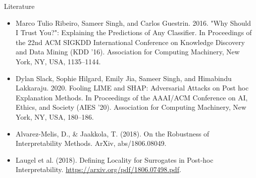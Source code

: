 \documentclass[11pt,compress,t,notes=noshow, xcolor=table]{beamer}
\begin{document}
\begin{vbframe}{Literature}
	\begin{itemize}
		\small
		\item Marco Tulio Ribeiro, Sameer Singh, and Carlos Guestrin. 2016. "Why Should I Trust You?": Explaining the Predictions of Any Classifier. In Proceedings of the 22nd ACM SIGKDD International Conference on Knowledge Discovery and Data Mining (KDD '16). Association for Computing Machinery, New York, NY, USA, 1135–1144. 
		\item Dylan Slack, Sophie Hilgard, Emily Jia, Sameer Singh, and Himabindu Lakkaraju. 2020. Fooling LIME and SHAP: Adversarial Attacks on Post hoc Explanation Methods. In Proceedings of the AAAI/ACM Conference on AI, Ethics, and Society (AIES '20). Association for Computing Machinery, New York, NY, USA, 180–186. 
		\item Alvarez-Melis, D., \& Jaakkola, T. (2018). On the Robustness of Interpretability Methods. ArXiv, abs/1806.08049.
		\item Laugel et al. (2018). Defining Locality for Surrogates in Post-hoc Interpretability. \url{https://arxiv.org/pdf/1806.07498.pdf}.
	\end{itemize}
	
\end{vbframe}


\endlecture
\end{document}
